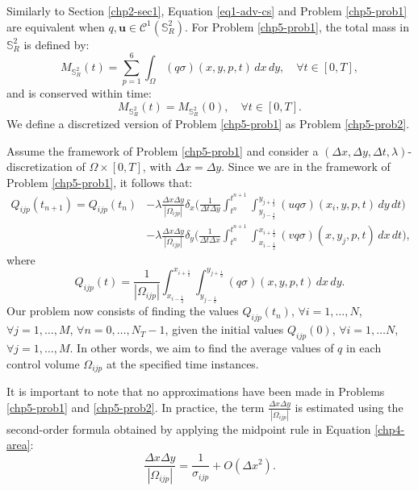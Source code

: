 Similarly to Section \ref{chp2-sec1}, Equation \eqref{eq1-adv-cs} and Problem \eqref{chp5-prob1} are equivalent
when ${q}, \boldsymbol{u} \in \mathcal{C}^1(\mathbb{S}^2_R)$.
For Problem \ref{chp5-prob1}, the total mass in $\mathbb{S}^2_R$ is defined by: 
\begin{equation}
	{M}_{\mathbb{S}^2_R}(t) = \sum_{p=1}^6 \int_{\Omega} {(q\sigma)}(x,y,p,t) \,dx \,dy , \quad \forall t \in [0,T],
\end{equation}
and is conserved within time: 
\begin{equation}
	{M}_{\mathbb{S}^2_R}(t) = {M}_{\mathbb{S}^2_R}(0), \quad \forall t \in [0,T].
\end{equation}
We define a discretized version of Problem \ref{chp5-prob1} as Problem \ref{chp5-prob2}.
\begin{prob}
	\label{chp5-prob2}
	Assume the framework of Problem \ref{chp5-prob1}
	and consider a $(\Delta x, \Delta y, \Delta t, \lambda)$-discretization of $\Omega\times [0,T]$, with $\Delta x= \Delta y$.
	Since we are in the framework of Problem \ref{chp5-prob1}, it follows that:
	\begin{align*}
		{Q}_{ijp}(t_{n+1})  = {Q}_{ijp}(t_{n})
		&- \lambda \frac{\Delta x  \Delta y}{|\Omega_{ijp}|}
		\delta _x \bigg( \frac{1}{\Delta t \Delta y}
		\int_{t^n}^{t^{n+1}} \int_{y_{j-\frac{1}{2}}}^{y_{j+\frac{1}{2}}} 
		{(uq\sigma)}(x_{i}, y, p, t)
		\,dy \,dt \bigg) \\ \nonumber
		&- \lambda \frac{\Delta x  \Delta y}{|\Omega_{ijp}|}
		\delta _y \bigg( \frac{1}{\Delta t \Delta x}
		\int_{t^n}^{t^{n+1}} \int_{x_{i-\frac{1}{2}}}^{x_{i+\frac{1}{2}}} 
		{(vq\sigma)}(x, y_{j}, p, t)
		\,dx \,dt \bigg),
	\end{align*}
	where
	\begin{equation}
	 {Q}_{ijp}(t) = \frac{1}{|\Omega_{ijp}|}
	\int_{x_{i-\frac{1}{2}}}^{x_{i+\frac{1}{2}}} 
	\int_{y_{j-\frac{1}{2}}}^{y_{j+\frac{1}{2}}} {(q\sigma)}(x,y,p,t) \,dx \,dy.
	\end{equation}
	Our problem now consists of finding the values ${Q}_{ijp}(t_{n})$, 
	$\forall i = 1, \ldots, N$, $\forall j = 1, \ldots, M$, $\forall n = 0, \ldots, N_T-1$,
	given the initial values ${Q}_{ijp}(0)$, $\forall i = 1, \ldots N$, $\forall j = 1, \ldots, M$.
	In other words, we aim to find the average values of ${q}$ in each control volume $\Omega_{ijp}$ at the specified time instances.
\end{prob}
It is important to note that no approximations have been made in Problems \eqref{chp5-prob1} and \eqref{chp5-prob2}. 
In practice, the term $\frac{\Delta x  \Delta y}{|\Omega_{ijp}|}$ is estimated using the second-order
formula obtained by applying the midpoint rule in Equation \eqref{chp4-area}:
\begin{equation}
\frac{\Delta x  \Delta y}{|\Omega_{ijp}|}= \frac{1}{\sigma_{ijp}} + O(\Delta x^2).
\end{equation}

